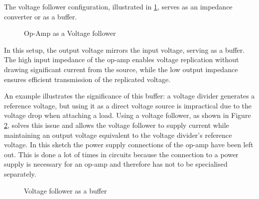 The voltage follower configuration, illustrated in \cref{fig:voltage-follower}, serves as an impedance converter or as a buffer.

\begin{figure}[htb]
	\centering
	\caption{Op-Amp as a Voltage follower}
	\label{fig:voltage-follower}
\end{figure}

In this setup, the output voltage mirrors the input voltage, serving as a buffer. The high input impedance of the op-amp enables voltage replication without drawing significant current from the source, while the low output impedance ensures efficient transmission of the replicated voltage.

An example illustrates the significance of this buffer: a voltage divider generates a reference voltage, but using it as a direct voltage source is impractical due to the voltage drop when attaching a load. Using a voltage follower, as shown in Figure \ref{fig:attenuator-buffer}, solves this issue and allows the voltage follower to supply current while maintaining an output voltage equivalent to the voltage divider's reference voltage. In this sketch the power supply connections of the op-amp have been left out. This is done a lot of times in circuits because the connection to a power supply is necessary for an op-amp and therefore has not to be specialised separately.

\begin{figure}[htb]
	\centering
	\caption{Voltage follower as a buffer}
	\label{fig:attenuator-buffer}
\end{figure}

